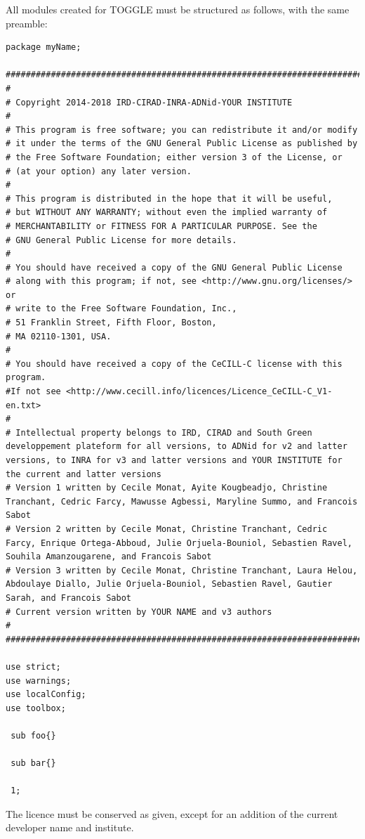 \documentclass[a4paper,10pt]{report}
\begin{document}
All modules created for TOGGLE must be structured as follows, with the same preamble:

\begin{lstlisting}
package myName;

################################################################################################################################
#
# Copyright 2014-2018 IRD-CIRAD-INRA-ADNid-YOUR INSTITUTE
#
# This program is free software; you can redistribute it and/or modify
# it under the terms of the GNU General Public License as published by
# the Free Software Foundation; either version 3 of the License, or
# (at your option) any later version.
#
# This program is distributed in the hope that it will be useful,
# but WITHOUT ANY WARRANTY; without even the implied warranty of
# MERCHANTABILITY or FITNESS FOR A PARTICULAR PURPOSE. See the
# GNU General Public License for more details.
#
# You should have received a copy of the GNU General Public License
# along with this program; if not, see <http://www.gnu.org/licenses/> or
# write to the Free Software Foundation, Inc.,
# 51 Franklin Street, Fifth Floor, Boston,
# MA 02110-1301, USA.
#
# You should have received a copy of the CeCILL-C license with this program.
#If not see <http://www.cecill.info/licences/Licence_CeCILL-C_V1-en.txt>
#
# Intellectual property belongs to IRD, CIRAD and South Green developpement plateform for all versions, to ADNid for v2 and latter versions, to INRA for v3 and latter versions and YOUR INSTITUTE for the current and latter versions
# Version 1 written by Cecile Monat, Ayite Kougbeadjo, Christine Tranchant, Cedric Farcy, Mawusse Agbessi, Maryline Summo, and Francois Sabot
# Version 2 written by Cecile Monat, Christine Tranchant, Cedric Farcy, Enrique Ortega-Abboud, Julie Orjuela-Bouniol, Sebastien Ravel, Souhila Amanzougarene, and Francois Sabot
# Version 3 written by Cecile Monat, Christine Tranchant, Laura Helou, Abdoulaye Diallo, Julie Orjuela-Bouniol, Sebastien Ravel, Gautier Sarah, and Francois Sabot 
# Current version written by YOUR NAME and v3 authors
#
################################################################################################################################

use strict;
use warnings;
use localConfig;
use toolbox;

 sub foo{}

 sub bar{}
 
 1;
 \end{lstlisting}

The licence must be conserved as given, except for an addition of the current developer name and institute.
\end{document}
